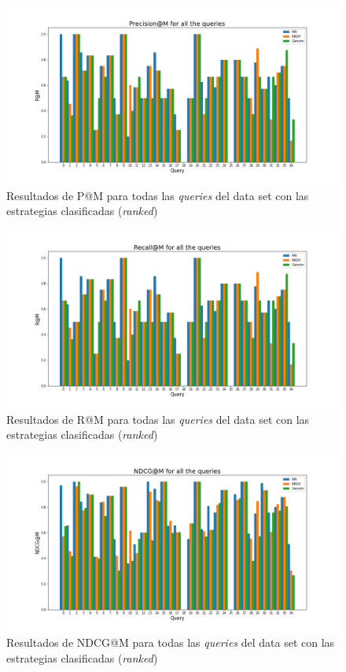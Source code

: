 \begin{figure}[H]
    \centering
    \includegraphics[width=\textwidth]{doc/images/P@M_Ranked.png}
    \caption{Resultados de P@M para todas las \textit{queries} del data set con las estrategias clasificadas (\textit{ranked})}
    \label{fig:rankedP}
\end{figure}

\begin{figure}[H]
    \centering
    \includegraphics[width=\textwidth]{doc/images/R@M_Ranked.png}
    \caption{Resultados de R@M para todas las \textit{queries} del data set con las estrategias clasificadas (\textit{ranked})}
    \label{fig:rankedR}
\end{figure}


\begin{figure}[H]
    \centering
    \includegraphics[width=\textwidth]{doc/images/NDCG@M_Ranked.png}
    \caption{Resultados de NDCG@M para todas las \textit{queries} del data set con las estrategias clasificadas (\textit{ranked})}
    \label{fig:rankedNDCG}
\end{figure}


